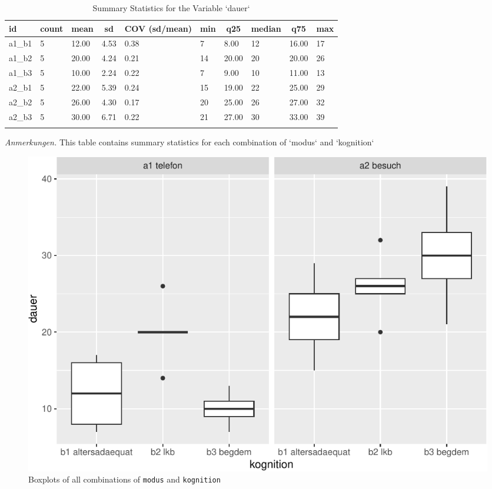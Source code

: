\documentclass[
  doc,floatsintext]{apa6}
\begin{document}
\begin{table}[tbp]

\begin{center}
\begin{threeparttable}

\caption{\label{tab:tabsummary}Summary Statistics for the Variable `dauer`}

\begin{tabular}{llllllllll}
\toprule
id & \multicolumn{1}{c}{count} & \multicolumn{1}{c}{mean} & \multicolumn{1}{c}{sd} & \multicolumn{1}{c}{COV (sd/mean)} & \multicolumn{1}{c}{min} & \multicolumn{1}{c}{q25} & \multicolumn{1}{c}{median} & \multicolumn{1}{c}{q75} & \multicolumn{1}{c}{max}\\
\midrule
a1\_b1 & 5 & 12.00 & 4.53 & 0.38 & 7 & 8.00 & 12 & 16.00 & 17\\
a1\_b2 & 5 & 20.00 & 4.24 & 0.21 & 14 & 20.00 & 20 & 20.00 & 26\\
a1\_b3 & 5 & 10.00 & 2.24 & 0.22 & 7 & 9.00 & 10 & 11.00 & 13\\
a2\_b1 & 5 & 22.00 & 5.39 & 0.24 & 15 & 19.00 & 22 & 25.00 & 29\\
a2\_b2 & 5 & 26.00 & 4.30 & 0.17 & 20 & 25.00 & 26 & 27.00 & 32\\
a2\_b3 & 5 & 30.00 & 6.71 & 0.22 & 21 & 27.00 & 30 & 33.00 & 39\\
\bottomrule
\addlinespace
\end{tabular}

\begin{tablenotes}[para]
\normalsize{\textit{Anmerkungen.} This table contains summary statistics for each combination of `modus` and `kognition`}
\end{tablenotes}

\end{threeparttable}
\end{center}

\end{table}

\begin{figure}
\centering
\includegraphics{desc_reg_files/figure-latex/aboxplot-1.pdf}
\caption{\label{fig:aboxplot}Boxplots of all combinations of \texttt{modus} and \texttt{kognition}}
\end{figure}
\end{document}
